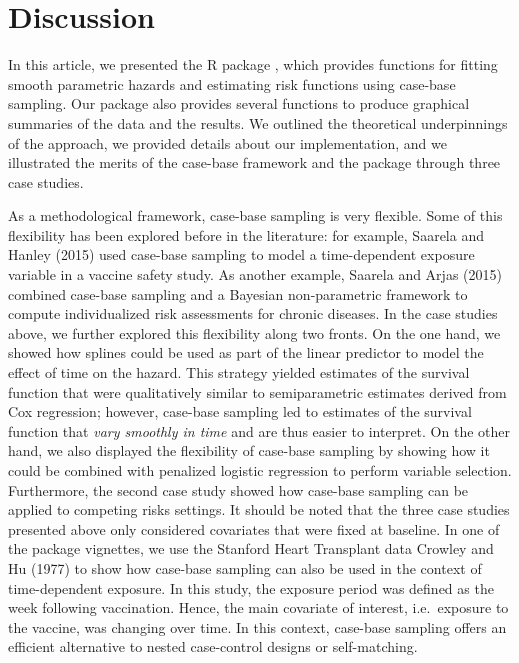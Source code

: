 \hypertarget{discussion}{%
\section{Discussion}\label{discussion}}

In this article, we presented the R package , which provides functions for fitting smooth parametric hazards and estimating risk functions using case-base sampling. Our package also provides several functions to produce graphical summaries of the data and the results. We outlined the theoretical underpinnings of the approach, we provided details about our implementation, and we illustrated the merits of the case-base framework and the package through three case studies.

As a methodological framework, case-base sampling is very flexible. Some of this flexibility has been explored before in the literature: for example, Saarela and Hanley (2015) used case-base sampling to model a time-dependent exposure variable in a vaccine safety study. As another example, Saarela and Arjas (2015) combined case-base sampling and a Bayesian non-parametric framework to compute individualized risk assessments for chronic diseases. In the case studies above, we further explored this flexibility along two fronts. On the one hand, we showed how splines could be used as part of the linear predictor to model the effect of time on the hazard. This strategy yielded estimates of the survival function that were qualitatively similar to semiparametric estimates derived from Cox regression; however, case-base sampling led to estimates of the survival function that \emph{vary smoothly in time} and are thus easier to interpret. On the other hand, we also displayed the flexibility of case-base sampling by showing how it could be combined with penalized logistic regression to perform variable selection. Furthermore, the second case study showed how case-base sampling can be applied to competing risks settings. It should be noted that the three case studies presented above only considered covariates that were fixed at baseline. In one of the package vignettes, we use the Stanford Heart Transplant data Crowley and Hu (1977) to show how case-base sampling can also be used in the context of time-dependent exposure. In this study, the exposure period was defined as the week following vaccination. Hence, the main covariate of interest, i.e.~exposure to the vaccine, was changing over time. In this context, case-base sampling offers an efficient alternative to nested case-control designs or self-matching.

